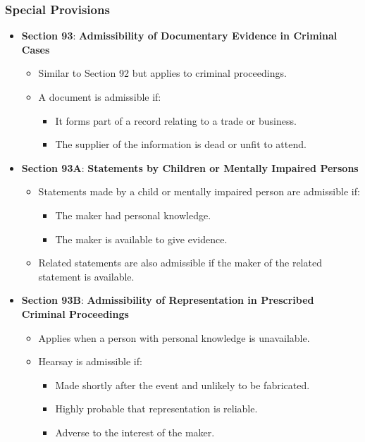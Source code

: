 \subsubsection{Special Provisions}\label{special-provisions}

\begin{itemize}
\tightlist
\item
  \textbf{Section 93}: \textbf{Admissibility of Documentary Evidence in
  Criminal Cases}

  \begin{itemize}
  \tightlist
  \item
    Similar to Section 92 but applies to criminal proceedings.
  \item
    A document is admissible if:

    \begin{itemize}
    \tightlist
    \item
      It forms part of a record relating to a trade or business.
    \item
      The supplier of the information is dead or unfit to attend.
    \end{itemize}
  \end{itemize}
\item
  \textbf{Section 93A}: \textbf{Statements by Children or Mentally
  Impaired Persons}

  \begin{itemize}
  \tightlist
  \item
    Statements made by a child or mentally impaired person are
    admissible if:

    \begin{itemize}
    \tightlist
    \item
      The maker had personal knowledge.
    \item
      The maker is available to give evidence.
    \end{itemize}
  \item
    Related statements are also admissible if the maker of the related
    statement is available.
  \end{itemize}
\item
  \textbf{Section 93B}: \textbf{Admissibility of Representation in
  Prescribed Criminal Proceedings}

  \begin{itemize}
  \tightlist
  \item
    Applies when a person with personal knowledge is unavailable.
  \item
    Hearsay is admissible if:

    \begin{itemize}
    \tightlist
    \item
      Made shortly after the event and unlikely to be fabricated.
    \item
      Highly probable that representation is reliable.
    \item
      Adverse to the interest of the maker.
    \end{itemize}
  \end{itemize}
\end{itemize}

